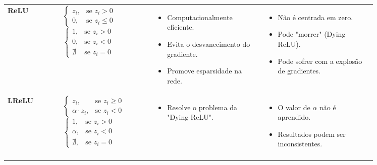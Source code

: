 \begin{longtable}{@{} l p{0.25\linewidth} p{0.3\linewidth} p{0.3\linewidth} @{}}
    \textbf{ReLU} & 
    $ \begin{cases}z_i, & \text{se } z_i > 0 \\0, & \text{se } z_i \leq 0\end{cases} $ \newline\vspace{0.2cm}
    $ \begin{cases}1, & \text{se } z_i > 0 \\0, & \text{se } z_i < 0 \\ \nexists & \text{se } z_i = 0\end{cases}$ 
    & 
    \begin{itemize}[noitemsep, topsep=0pt, partopsep=0pt, leftmargin=*]
        \item Computacionalmente eficiente.
        \item Evita o desvanecimento do gradiente.
        \item Promove esparsidade na rede.
    \end{itemize}
    &
    \begin{itemize}[noitemsep, topsep=0pt, partopsep=0pt, leftmargin=*]
        \item Não é centrada em zero.
        \item Pode "morrer" (Dying ReLU).
        \item Pode sofrer com a explosão de gradientes.
    \end{itemize}
    \\ \addlinespace

    \textbf{LReLU} & 
    $ \begin{cases}z_i, & \text{se } z_i \ge 0 \\ \alpha \cdot z_i, & \text{se } z_i < 0\end{cases} $ \newline\vspace{0.2cm}
    $\begin{cases}1, & \text{se } z_i > 0 \\ \alpha, & \text{se } z_i < 0 \\ \nexists, & \text{se } z_i = 0\end{cases}$
    &
    \begin{itemize}[noitemsep, topsep=0pt, partopsep=0pt, leftmargin=*]
        \item Resolve o problema da "Dying ReLU".
    \end{itemize}
    &
    \begin{itemize}[noitemsep, topsep=0pt, partopsep=0pt, leftmargin=*]
        \item O valor de $\alpha$ não é aprendido.
        \item Resultados podem ser inconsistentes.
    \end{itemize}
    \\ \addlinespace


\end{longtable}
